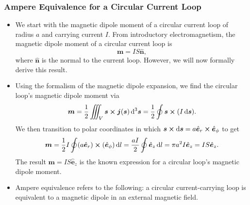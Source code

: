 \documentclass[11pt, a4paper]{article}
\newcommand{\diff}{\mathop{}\!\mathrm{d}} %
\renewcommand{\vec}[1]{\bm{#1}} %
\newcommand{\uvec}[1]{\hat{\vec{#1}}} %
\newcommand{\m}{\vec{m}}  %
\renewcommand{\j}{\vec{j}}  %
\newcommand{\s}{\vec{s}}  %
\newcommand{\ds}{\diff^{3} \s}  %
\begin{document}
\subsubsection{Ampere Equivalence for a Circular Current Loop}
\begin{itemize}
	\item We start with the magnetic dipole moment of a circular current loop of radius $ a $ and carrying current $ I $. From introductory electromagnetism, the magnetic dipole moment of a circular current loop is
    \begin{equation*}
       \vec{m} = IS\uvec{n},
    \end{equation*}
    where $ \uvec{n} $ is the normal to the current loop. However, we will now formally derive this result.
	
	\item Using the formalism of the magnetic dipole expansion, we find the circular loop's magnetic dipole moment via
	\begin{equation*}
		\m = \frac{1}{2}\iiint_{V}\s \cross \j(\s)\ds =  \frac{1}{2}\oint \s \cross (I \diff \vec{s}).
	\end{equation*}
    We then transition to polar coordinates in which $ \vec{s} \cross \diff \s = a \uvec{e}_{r} \cross \uvec{e}_{\phi} $ to get
	\begin{equation*}
		\m = \frac{1}{2}I\oint (a \uvec{e}_{r}) \cross  (\uvec{e}_{\phi})\diff l = \frac{aI}{2} \oint \uvec{e}_{z} \diff l = \pi a^{2}I \uvec{e}_{z} = IS\uvec{e}_{z}.
	\end{equation*}
    The result $ \m = I S \uvec{e}_{z} $ is the known expression for a circular loop's magnetic dipole moment.
	
	\item Ampere equivalence refers to the following: a circular current-carrying loop is equivalent to a magnetic dipole in an external magnetic field.
\end{itemize}
\end{document}
